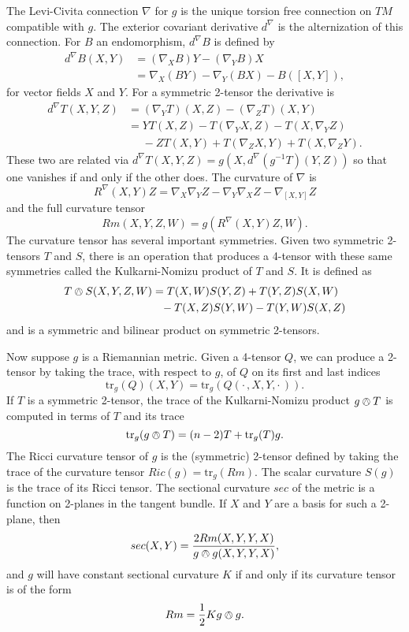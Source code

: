 \documentclass{amsart}
\newcommand{\tr}{\mathrm{tr}}
\numberwithin{equation}{section}
\begin{document}
The Levi-Civita connection $\nabla$ for $g$ is the unique torsion free connection on $TM$ compatible with $g$.
The exterior covariant derivative $d^\nabla$ is the alternization of this connection.
For $B$ an endomorphism, $d^\nabla B$ is defined by
\begin{align*}
d^\nabla B(X,Y) &= (\nabla_XB)Y - (\nabla_YB)X \\
&= \nabla_X(BY)- \nabla_Y(BX) - B([X,Y]),
\end{align*}
for vector fields $X$ and $Y$.
For a symmetric 2-tensor the derivative is 
\begin{align*}
d^\nabla T(X,Y,Z)
&= (\nabla_YT)(X,Z)- (\nabla_Z T)(X,Y) \\
&= YT(X,Z) - T(\nabla_YX,Z) - T(X,\nabla_YZ) \\
&\phantom{=} - ZT(X,Y) + T(\nabla_ZX,Y) + T(X,\nabla_ZY).
\end{align*}
These two are related via $d^\nabla T(X,Y,Z) = g(X, d^\nabla(g^{-1}T)(Y,Z))$ so that one vanishes if and only if the other does.
The curvature of $\nabla$ is 
\[
R^\nabla(X,Y)Z = \nabla_X\nabla_Y Z - \nabla_Y\nabla_X Z - \nabla_{[X,Y]}Z
\]
and the full curvature tensor 
\[
Rm(X,Y,Z,W) = g(R^\nabla(X,Y)Z,W).
\]
The curvature tensor has several important symmetries.
Given two symmetric 2-tensors $T$ and $S$, there is an operation that produces a 4-tensor with these same symmetries called the Kulkarni-Nomizu product of $T$ and $S$. 
It is defined as
\begin{align*}
T \owedge S(X,Y,Z,W)
&= T(X,W)S(Y,Z) + T(Y,Z)S(X,W) \\
&\phantom{=} - T(X,Z)S(Y,W) - T(Y,W)S(X,Z)
\end{align*}
and is a symmetric and bilinear product on symmetric 2-tensors.


Now suppose $g$ is a Riemannian metric.
Given a 4-tensor $Q$, we can produce a 2-tensor by taking the trace, with respect to $g$, of $Q$ on its first and last indices
\[
\tr_g(Q)(X,Y) = \tr_g( Q(\cdot \, , X,Y, \cdot \,)).
\]
If $T$ is a symmetric 2-tensor, the trace of the Kulkarni-Nomizu product $g \owedge T$ is computed in terms of $T$ and its trace
\begin{equation}
\label{TraceKN}
\tr_g( g \owedge T) = (n-2)T + \tr_g(T)g.
\end{equation}
The Ricci curvature tensor of $g$ is the (symmetric) 2-tensor defined by taking the trace of the curvature tensor $Ric(g) = \tr_g(Rm)$.
The scalar curvature $S(g)$ is the trace of its Ricci tensor.
The sectional curvature $sec$ of the metric is a function on 2-planes in the tangent bundle. 
If $X$ and $Y$ are a basis for such a 2-plane, then
\[
sec(X,Y) = \frac{2Rm(X,Y,Y,X)}{g \owedge g(X,Y,Y,X)},
\]
and $g$ will have constant sectional curvature $K$ if and only if its curvature tensor is of the form 
\[
Rm = \frac{1}{2}K g \owedge g.
\]
\end{document}
